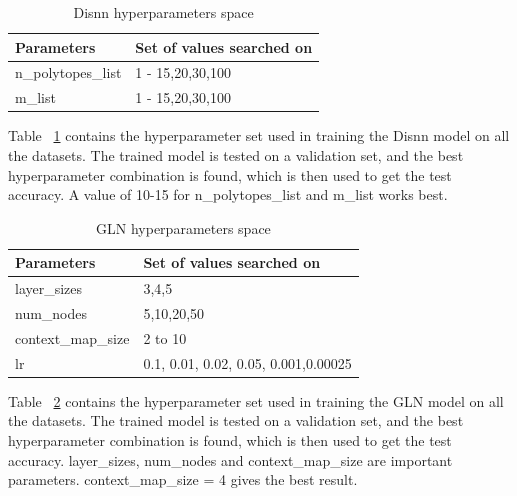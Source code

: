 \documentclass{article} %
\renewcommand{\>}{{\rightarrow}}
\renewcommand{\=}{\stackrel{\triangle}{=}}
\newcommand{\0}{{\mathbf 0}}
\begin{document}
\begin{table}[htbp]
\caption{Disnn hyperparameters space}
\label{disnn-hyp}
\begin{center}
\begin{tabular}{|p{4cm}|p{8cm}|}
\hline
Parameters &Set of values searched on\\
 \hline
n\_polytopes\_list &1 - 15,20,30,100\\
m\_list &1 - 15,20,30,100\\
\hline 
\end{tabular}
\end{center}
\end{table}

Table ~\ref{disnn-hyp} contains the hyperparameter set used in training the Disnn model on all the datasets. The trained model is tested on a validation set, and the best hyperparameter combination is found, which is then used to get the test accuracy. A value of 10-15 for n\_polytopes\_list and m\_list works best.
 
\begin{table}[htbp]
\caption{GLN hyperparameters space}
\label{gln-hyp}
\begin{center}
\begin{tabular}{|p{4cm}|p{8cm}|}
\hline
Parameters &Set of values searched on\\
 \hline
layer\_sizes &3,4,5\\
num\_nodes &5,10,20,50\\
context\_map\_size &2 to 10\\
lr &0.1, 0.01, 0.02, 0.05, 0.001,0.00025\\
\hline 
\end{tabular}
\end{center}
\end{table}

Table ~\ref{gln-hyp} contains the hyperparameter set used in training the GLN model on all the datasets. The trained model is tested on a validation set, and the best hyperparameter combination is found, which is then used to get the test accuracy. layer\_sizes, num\_nodes and  context\_map\_size are important parameters. context\_map\_size = 4 gives the best result.


\end{document}
